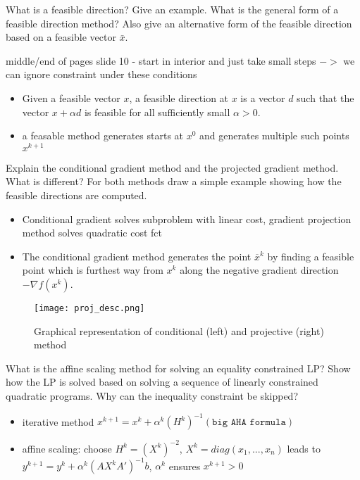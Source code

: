 \documentclass{article}
\begin{document}
\begin{question}
  What is a feasible direction? Give an example. What is the general form of a feasible direction
  method? Also give an alternative form of the feasible direction based on a feasible vector
  \(\bar{x}\).
\end{question}
middle/end of pages slide 10 - start in interior and just take small steps $->$ we can ignore
constraint under these conditions
\begin{itemize}
\item Given a feasible vector $x$, a feasible
  direction at $x$ is a vector $d$ such that the
  vector $x + \alpha d$ is feasible for all sufficiently
  small $\alpha > 0$.
\item a feasable method generates starts at $x^0$ and generates multiple such points $x^{k+1}$
\end{itemize}

\begin{question}
  Explain the conditional gradient method and the projected gradient method.  What is different? For
  both methods draw a simple example showing how the feasible directions are computed.
\end{question}
\begin{itemize}
\item Conditional gradient solves subproblem with linear cost, gradient projection method solves
  quadratic cost fct
\item The conditional gradient method generates the point $\overline{x}^k$ by finding a feasible
  point which is furthest way from $x^k$ along the negative gradient direction $-\nabla f (x^k )$.

\end{itemize}
\begin{figure}[H]
  \texttt{[image: proj\_desc.png]}
  \caption{Graphical representation of conditional (left) and projective (right)
    method\label{fig:proj_desc}}
\end{figure}

\begin{question}
  What is the affine scaling method for solving an equality constrained LP? Show how the LP is
  solved based on solving a sequence of linearly constrained quadratic programs. Why can the
  inequality constraint be skipped?
\end{question}
\begin{itemize}
\item iterative method $x^{k+1} = x^k + \alpha^k (H^k)^{-1} (\texttt{big AHA formula})$
\item affine scaling: choose $H^k = (X^k)^{-2}$, $X^k = diag(x_1, ..., x_n)$ leads to
  $y^{k+1} = y^k + \alpha^k (AX^k A' )^{-1} b $, $\alpha^k$ ensures $x^{k+1} > 0$
\end{itemize}
\end{document}
